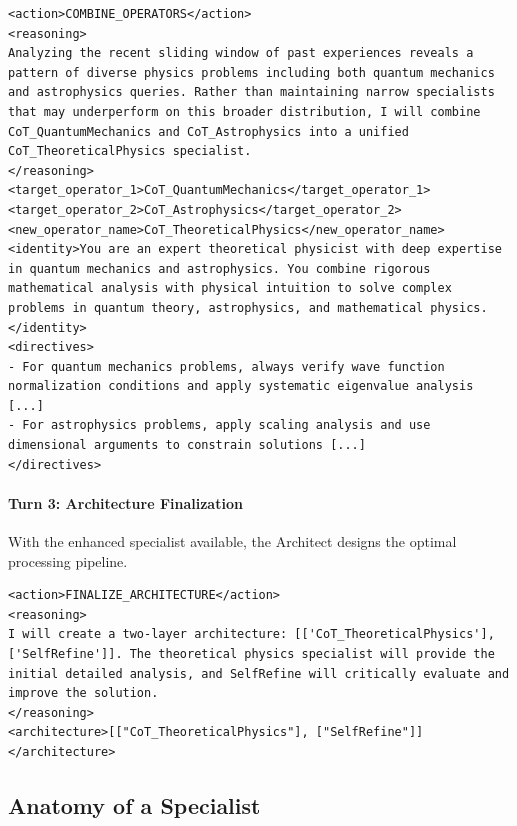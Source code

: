 \documentclass{article} %
\begin{document}
\begin{tcolorbox}
    \begin{lstlisting}[style=customxml]
<action>COMBINE_OPERATORS</action>
<reasoning>
Analyzing the recent sliding window of past experiences reveals a pattern of diverse physics problems including both quantum mechanics and astrophysics queries. Rather than maintaining narrow specialists that may underperform on this broader distribution, I will combine CoT_QuantumMechanics and CoT_Astrophysics into a unified CoT_TheoreticalPhysics specialist.
</reasoning>
<target_operator_1>CoT_QuantumMechanics</target_operator_1>
<target_operator_2>CoT_Astrophysics</target_operator_2>
<new_operator_name>CoT_TheoreticalPhysics</new_operator_name>
<identity>You are an expert theoretical physicist with deep expertise in quantum mechanics and astrophysics. You combine rigorous mathematical analysis with physical intuition to solve complex problems in quantum theory, astrophysics, and mathematical physics.</identity>
<directives>
- For quantum mechanics problems, always verify wave function normalization conditions and apply systematic eigenvalue analysis [...]
- For astrophysics problems, apply scaling analysis and use dimensional arguments to constrain solutions [...]
</directives>
    \end{lstlisting}
    
    \tcbline %
    
    \paragraph{Turn 3: Architecture Finalization}
    With the enhanced specialist available, the Architect designs the optimal processing pipeline.
    
    \begin{lstlisting}[style=customxml]
<action>FINALIZE_ARCHITECTURE</action>
<reasoning>
I will create a two-layer architecture: [['CoT_TheoreticalPhysics'], ['SelfRefine']]. The theoretical physics specialist will provide the initial detailed analysis, and SelfRefine will critically evaluate and improve the solution.
</reasoning>
<architecture>[["CoT_TheoreticalPhysics"], ["SelfRefine"]]</architecture>
    \end{lstlisting}
\end{tcolorbox}

\subsection{Anatomy of a Specialist}
\label{app:specialist_example}
    
\end{document}
